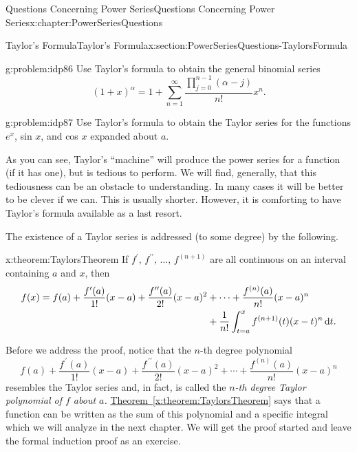 \begin{chapterptx}{Questions Concerning Power Series}{}{Questions Concerning Power Series}{}{}{x:chapter:PowerSeriesQuestions}
\begin{sectionptx}{Taylor's Formula}{}{Taylor's Formula}{}{}{x:section:PowerSeriesQuestions-TaylorsFormula}
		\begin{problem}{}{g:problem:idp86}%
			 Use Taylor's formula to obtain the general binomial series%
			\begin{equation*}
				(1+x)^\alpha=1+\sum_{n=1}^\infty\frac{\prod_{j=0}^{n-1}\left(\alpha-j\right)}{n!}x^n.{}
			\end{equation*}
		\end{problem}
		\begin{problem}{}{g:problem:idp87}%
			 Use Taylor's formula to obtain the Taylor series for the functions \(e^x\), sin \(x\), and cos \(x\) expanded about \(a\).%
		\end{problem}
		As you can see, Taylor's ``machine'' will produce the power series for a function (if it has one), but is tedious to perform. We will find, generally, that this tediousness can be an obstacle to understanding. In many cases it will be better to be clever if we can. This is usually shorter. However, it is comforting to have Taylor's formula available as a last resort.%
		\par
		The existence of a Taylor series is addressed (to some degree) by the following.%
		\begin{theorem}{}{}{x:theorem:TaylorsTheorem}%
			 If \(f^\prime,\,f^{\prime\prime},\,\ldots,\,f^{(n+1)}\) are all continuous on an interval containing \(a\) and \(x\), then%
			\begin{align*}
				f(x)=f(a)+\frac{f^{\prime}(a)}{1!}(x-a)+\frac{f^{\prime \prime}(a)}{2!}(x-a)^2& +\cdots+\frac{f^{(n)}(a)}{n!}(x-a)^n\\
				& + \frac{1}{n!}\int_{t=a}^xf^{(n+1)}(t)(x-t)^n\,{\rm d}t\text{.}
			\end{align*}
		\end{theorem}
		Before we address the proof, notice that the \(n\)-th degree polynomial%
		\begin{equation*}
			f(a)+\frac{f^{\,\prime}(a)}{1!}(x-a)+\frac{f^{\,\prime\prime}(a)}{2!}(x-a)^2+\cdots+\frac{f^{(n)}(a)}{n!}(x-a)^n
		\end{equation*}
		resembles the Taylor series and, in fact, is called the \emph{\(n\)-th degree Taylor polynomial of \(f\) about \(a\).} \hyperref[x:theorem:TaylorsTheorem]{Theorem~{\xreffont\ref{x:theorem:TaylorsTheorem}}} says that a function can be written as the sum of this polynomial and a specific integral which we will analyze in the next chapter. We will get the proof started and leave the formal induction proof as an exercise.%

\end{sectionptx}
\end{chapterptx}

